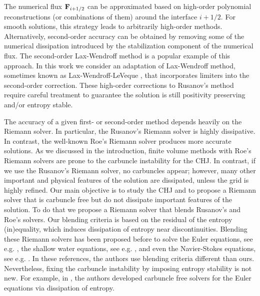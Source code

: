 \documentclass[preprint, 11pt]{article}
\newcommand{\bfF}{{\bf F}}
\begin{document}
The numerical flux $\bfF_{i+1/2}$ can be approximated based on high-order polynomial 
reconstructions (or combinations of them) around the interface $i+1/2$. 
For smooth solutions, this strategy leads to arbitrarily high-order
methods. Alternatively, second-order accuracy can be obtained by removing some of the 
numerical dissipation introduced by the stabilization component of the numerical flux. 
The second-order Lax-Wendroff method \cite{lax1959systems} is a popular example of this approach. 
In this work we consider an adaptation of Lax-Wendroff method,
sometimes known as Lax-Wendroff-LeVeque \cite{leveque1997wave,leveque2002finite}, 
that incorporates limiters into the second-order correction. 
These high-order corrections to Rusanov's method require careful treatment to guarantee 
the solution is still positivity preserving and/or entropy stable. 

The accuracy of a given first- or second-order method depends heavily on the Riemann solver. 
In particular, the Rusanov's Riemann solver is highly dissipative. In contrast, the well-known 
Roe's Riemann solver produces more accurate solutions. 
%
As we discussed in the introduction, finite volume methods with 
Roe's Riemann solvers are prone to the carbuncle instability for the CHJ. 
In contrast, if we use the Rusanov's 
Riemann solver, no carbuncles appear; however, many other important and physical features of 
the solution are dissipated, unless the grid is highly refined. 
Our main objective is to study the CHJ and to propose a Riemann solver
that is carbuncle free but do not dissipate important features of the solution. 
To do that we propose a Riemann solver that blends Rusanov's and Roe's solvers. 
Our blending criteria is based on the residual of the entropy (in)equality,
which induces dissipation of entropy near discontinuities. 
Blending these Riemann solvers has been proposed before
to solve the Euler equations, see e.g.
\cite{nishikawa2008very,wang2016developing,jaisankar2007diffusion,ohwada2018simple,deng2019new,ray2013entropy},
the shallow water equations, see e.g. \cite{bader2014carbuncle,kemm2014note},
and even the Navier-Stokes equations, see e.g. \cite{nishikawa2008very,ohwada2018simple}.
In these references, the authors use blending criteria different than ours.
Nevertheless, fixing the carbuncle instability by imposing entropy stability is not new.
For example, in \cite{ismail2009affordable,ismail2009proposed},
the authors developed carbuncle free solvers for the Euler equations
via dissipation of entropy. 
\end{document}
